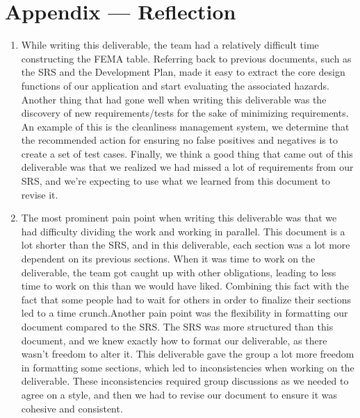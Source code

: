 \documentclass{article}
\begin{document}
\newpage{}

\section*{Appendix --- Reflection}

\begin{enumerate}
    \item While writing this deliverable, the team had a relatively difficult time constructing the FEMA table. Referring back to previous documents, such as the SRS and the Development Plan, made it easy to extract the core design functions of our application and start evaluating the associated hazards. Another thing that had gone well when writing this deliverable was the discovery of new requirements/tests for the sake of minimizing requirements. An example of this is the cleanliness management system, we determine that the recommended action for ensuring no false positives and negatives is to create a set of test cases. Finally, we think a good thing that came out of this deliverable was that we realized we had missed a lot of requirements from our SRS, and we're expecting to use what we learned from this document to revise it.
    
    \item The most prominent pain point when writing this deliverable was that we had difficulty dividing the work and working in parallel. This document is a lot shorter than the SRS, and in this deliverable, each section was a lot more dependent on its previous sections. When it was time to work on the deliverable, the team got caught up with other obligations, leading to less time to work on this than we would have liked. Combining this fact with the fact that some people had to wait for others in order to finalize their sections led to a time crunch.\newline Another pain point was the flexibility in formatting our document compared to the SRS. The SRS was more structured than this document, and we knew exactly how to format our deliverable, as there wasn't freedom to alter it. This deliverable gave the group a lot more freedom in formatting some sections, which led to inconsistencies when working on the deliverable. These inconsistencies required group discussions as we needed to agree on a style, and then we had to revise our document to ensure it was cohesive and consistent. 
    

\end{enumerate}
\end{document}
